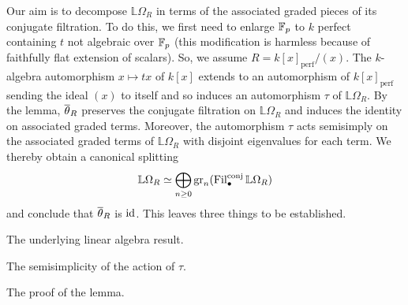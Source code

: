 \documentclass[11pt]{article}
\renewcommand{\L}{\mathbb{L}} %
\DeclareMathOperator{\conj}{conj} %
\DeclareMathOperator{\perf}{perf} %
\begin{document}
Our aim is to decompose $\L\Omega_R$ in terms of the associated graded pieces of its conjugate filtration. To do this, we first need to enlarge $\mathbb{F}_p$ to $k$ perfect containing $t$ not algebraic over $\mathbb{F}_p$ (this modification is harmless because of faithfully flat extension of scalars). So, we assume $R=k[x]_{\perf}/(x)$. The $k$-algebra automorphism $x\mapsto tx$ of $k[x]$ extends to an automorphism of $k[x]_{\perf}$ sending the ideal $(x)$ to itself and so induces an automorphism $\tau$ of $\L\Omega_R$. By the lemma, $\overline{\theta}_R$ preserves the conjugate filtration on $\L\Omega_R$ and induces the identity on associated graded terms. Moreover, the automorphism $\tau$ acts semisimply on the associated graded terms of $\L\Omega_R$ with disjoint eigenvalues for each term. We thereby obtain a canonical splitting 
$$\L\Omega_R\simeq\bigoplus_{n\geq0}\gr_n(\Fil_{\bullet}^{\conj}\L\Omega_R)$$
and conclude that $\overline{\theta}_R$ is $\operatorname{id}$. This leaves three things to be established.
\begin{enum}{\arabic}
\item The underlying linear algebra result.

\item The semisimplicity of the action of $\tau$.

\item The proof of the lemma.
\end{enum}
\end{document}

